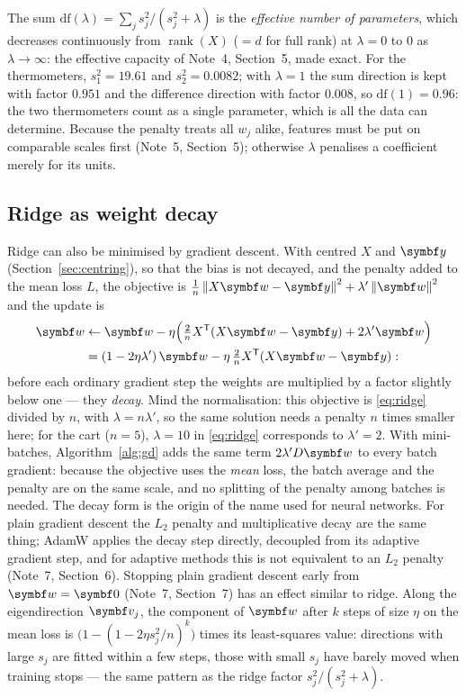 \documentclass[11pt]{article}
\newcommand{\w}{\vect{w}}
\newcommand{\y}{\vect{y}}
\newcommand{\Ic}{D}
\begin{document}
The sum $\mathrm{df}(\lambda) = \sum_j s_j^2/(s_j^2 + \lambda)$ is the \emph{effective number of parameters}, which
decreases continuously from $\operatorname{rank}(X)$ ($= d$ for full rank) at $\lambda = 0$ to $0$ as $\lambda \to \infty$: the effective capacity of Note~4,
Section~5, made exact. For the thermometers, $s_1^2 = 19.61$ and $s_2^2 = 0.0082$; with $\lambda = 1$ the sum direction is
kept with factor $0.951$ and the difference direction with factor $0.008$, so $\mathrm{df}(1) = 0.96$: the two
thermometers count as a single parameter, which is all the data can determine. Because the penalty treats all $w_j$
alike, features must be put on comparable scales first (Note~5, Section~5); otherwise $\lambda$ penalises a coefficient
merely for its units.

\subsection{Ridge as weight decay}\label{sec:weightdecay}

Ridge can also be minimised by gradient descent. With centred $X$ and $\y$ (Section~\ref{sec:centring}), so that the
bias is not decayed, and the penalty added to the mean loss $L$, the objective is
$\frac1n\norm{X\w - \y}^2 + \lambda'\norm{\w}^2$ and the update is
\begin{align*}
  \w &\leftarrow \w - \eta\Big(\tfrac2n X\T(X\w - \y) + 2\lambda'\w\Big) \\
     &= (1 - 2\eta\lambda')\,\w - \eta\,\tfrac2n X\T(X\w - \y) :
\end{align*}
before each ordinary gradient step the weights are multiplied by a factor slightly below one --- they \emph{decay}. Mind
the normalisation: this objective is \eqref{eq:ridge} divided by $n$, with $\lambda = n\lambda'$, so the same solution
needs a penalty $n$ times smaller here; for the cart ($n = 5$), $\lambda = 10$ in \eqref{eq:ridge} corresponds to
$\lambda' = 2$. With mini-batches, Algorithm~\ref{alg:gd} adds the same term $2\lambda'\Ic\w$ to every batch gradient:
because the objective uses the \emph{mean} loss, the batch average and the penalty are on the same scale, and no
splitting of the penalty among batches is needed. The decay form is the origin of the name used for neural networks. For plain gradient descent the $L_2$
penalty and multiplicative decay are the same thing; AdamW applies the decay step directly, decoupled from its adaptive
gradient step, and for adaptive methods this is not equivalent to an $L_2$ penalty (Note~7, Section~6). Stopping plain
gradient descent early from $\w = \vect{0}$ (Note~7, Section~7) has an effect similar to ridge. Along the eigendirection
$\vect{v}_j$, the component of $\w$ after $k$ steps of size $\eta$ on the mean loss is
$\big(1 - (1 - 2\eta s_j^2/n)^k\big)$ times its least-squares value: directions with large $s_j$ are fitted within a
few steps, those with small $s_j$ have barely moved when training stops --- the same pattern as the ridge factor
$s_j^2/(s_j^2 + \lambda)$.
\end{document}
